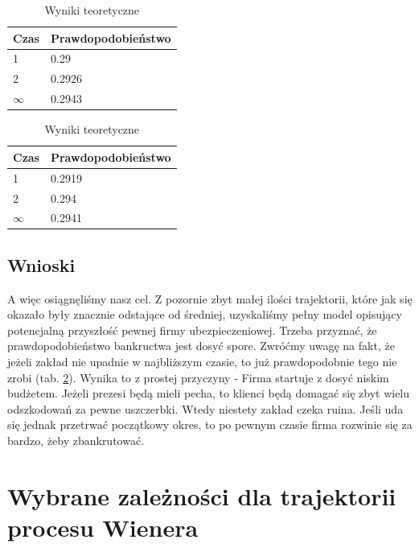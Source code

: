 \documentclass{article}
\theoremstyle{break}
\numberwithin{equation}{subsection}
\numberwithin{figure}{section}
\begin{document}
\begin{table}[H]
\begin{multicols}{2}
	\begin{center}
	\begin{tabular}{|l|l|}
		\hline
		\rowcolor[HTML]{EFEFEF} 
		Czas     & Prawdopodobieństwo \\ \hline
		1        & 0.29                  \\ \hline
		2        & 0.2926                  \\ \hline
		$\infty$ & 0.2943                  \\ \hline
	\end{tabular}
\caption{Wyniki otrzymane metodą Monte Carlo}
\label{table:MC}
	\begin{tabular}{|l|l|}
		\hline
		\rowcolor[HTML]{EFEFEF} 
		Czas     & Prawdopodobieństwo \\ \hline
		1        & 0.2919                  \\ \hline
		2        & 0.294             \\ \hline
		$\infty$ & 0.2941                  \\ \hline
	\end{tabular}
\caption{Wyniki teoretyczne}
\label{table:XD}
	\end{center}

\end{multicols}
\end{table}

\subsection*{Wnioski}

A więc osiągnęliśmy nasz cel. Z pozornie zbyt małej ilości trajektorii, które jak się okazało były znacznie odstające od średniej, uzyskaliśmy pełny model opisujący potencjalną przyszłość pewnej firmy ubezpieczeniowej. Trzeba przyznać, że prawdopodobieństwo bankructwa jest dosyć spore. Zwróćmy uwagę na fakt, że jeżeli zakład nie upadnie w najbliższym czasie, to już prawdopodobnie tego nie zrobi (tab. \ref{table:XD}). Wynika to z prostej przyczyny - Firma startuje z dosyć niskim budżetem. Jeżeli prezesi będą mieli pecha, to klienci będą domagać się zbyt wielu odszkodowań za pewne uszczerbki. Wtedy niestety zakład czeka ruina. Jeśli uda się jednak przetrwać początkowy okres, to po pewnym czasie firma rozwinie się za bardzo, żeby zbankrutować.

\section{Wybrane zależności dla trajektorii procesu Wienera}
\end{document}
